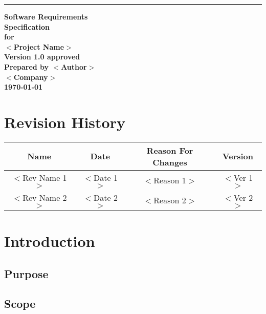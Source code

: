 \documentclass{scrreprt}
\date{}
\title{}
\def\myversion{1.0 }
\begin{document}
\begin{flushright}
    \rule{14cm}{5pt}
    \vskip1cm
    {\bfseries
        \Huge{Software Requirements\\ Specification}\\
        \vspace{1.6cm}
        for\\
        \vspace{1.6cm}
        $<$Project Name$>$\\
        \vspace{1.6cm}
        \LARGE{Version \myversion approved}\\
        \vspace{1.6cm}
        Prepared by $<$Author$>$\\
        \vspace{1.6cm}
        $<$Company$>$\\
        \vspace{1.6cm}
        \today\\
    }
\end{flushright}

\tableofcontents

\chapter*{Revision History}

\begin{center}
    \begin{tabular}{|c|c|c|c|}
        \hline
	    Name & Date & Reason For Changes & Version\\
        \hline
	    $<$Rev Name 1$>$ & $<$Date 1$>$ & $<$Reason 1$>$ & $<$Ver 1$>$\\
        \hline
	    $<$Rev Name 2$>$ & $<$Date 2$>$ & $<$Reason 2$>$ & $<$Ver 2$>$\\
        \hline
    \end{tabular}
\end{center}

\chapter{Introduction}

\section{Purpose}

\section{Scope}
\end{document}
